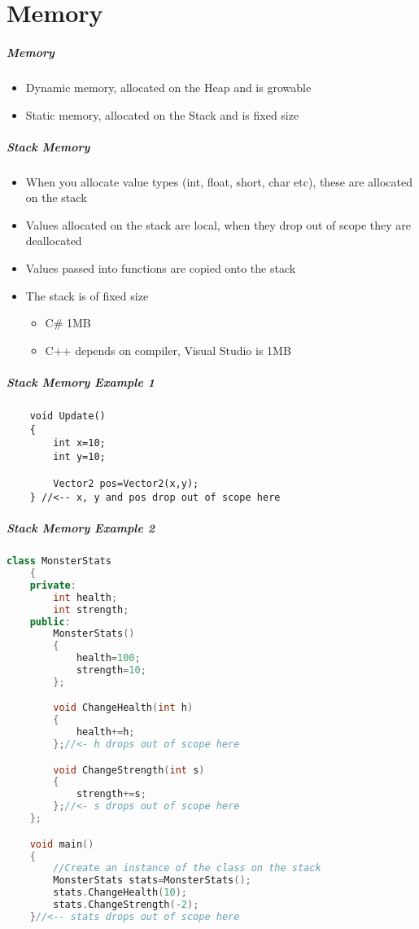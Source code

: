 \part{Memory}
\frame{\partpage}

\begin{frame}
\frametitle{Memory}
\begin{itemize}
	\item Dynamic memory, allocated on the Heap and is growable
	\item Static memory, allocated on the Stack and is fixed size
\end{itemize}
\end{frame}

\begin{frame}
\frametitle{Stack Memory}
\begin{itemize}
\item When you allocate value types (int, float, short, char etc), these are allocated on the stack
\item Values allocated on the stack are local, when they drop out of scope they are deallocated  
\item Values passed into functions are copied onto the stack
\item The stack is of fixed size
\begin{itemize}
	\item C\# 1MB
	\item C++ depends on compiler, Visual Studio is 1MB
\end{itemize}
\end{itemize}
\end{frame}

\begin{frame}[fragile]
\frametitle{Stack Memory Example 1}
\begin{lstlisting}
	void Update()
	{
		int x=10;
		int y=10;

		Vector2 pos=Vector2(x,y);
	} //<-- x, y and pos drop out of scope here
\end{lstlisting} 
\end{frame}

\begin{frame}[fragile]
\frametitle{Stack Memory Example 2}
\begin{lstlisting}[language=C++,basicstyle=\tiny,]
	class MonsterStats
	{
	private:
		int health;
		int strength;
	public:
		MonsterStats()
		{
			health=100;
			strength=10;
		};

		void ChangeHealth(int h)
		{
			health+=h;
		};//<- h drops out of scope here

		void ChangeStrength(int s)
		{
			strength+=s;
		};//<- s drops out of scope here
	};

	void main()
	{		
		//Create an instance of the class on the stack
		MonsterStats stats=MonsterStats();
		stats.ChangeHealth(10);
		stats.ChangeStrength(-2);
	}//<-- stats drops out of scope here
\end{lstlisting}
\end{frame}


